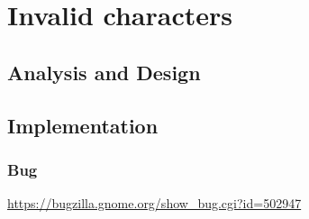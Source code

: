 
\chapter{Invalid characters}

\section{Analysis and Design}

\section{Implementation}

\subsection{Bug}

\noindent\url{https://bugzilla.gnome.org/show_bug.cgi?id=502947}
